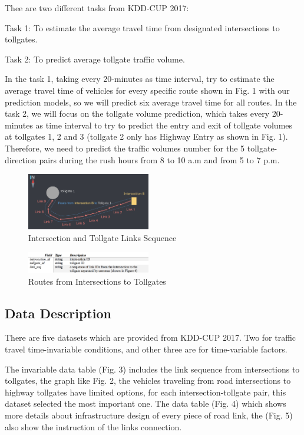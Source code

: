 \documentclass[journal, letterpaper]{IEEEtran}
\begin{document}
Thee are two different tasks from KDD-CUP 2017: 

	Task 1: To estimate the average travel time from designated intersections to tollgates. 
    
    Task 2: To predict average tollgate traffic volume.

In the task 1, taking every 20-minutes as time interval, try to estimate the average travel time of vehicles for every specific route shown in Fig. 1 with our prediction models, so we will predict six average travel time for all routes. In the task 2, we will focus on the tollgate volume prediction, which takes every 20-minutes as time interval to try to predict the entry and exit of tollgate volumes at tollgates 1, 2 and 3 (tollgate 2 only has Highway Entry as shown in Fig. 1). Therefore, we need to predict the traffic volumes number for the 5 tollgate-direction pairs during the rush hours from 8 to 10 a.m and from 5 to 7 p.m.

\begin{figure} [t]
  \centering
  \includegraphics[width=0.48\textwidth]{link-sequence.png}
  \caption{Intersection and Tollgate Links Sequence}
  \label{fig:2}
\end{figure}

\begin{figure} [H]
  \centering
  \includegraphics[width=0.48\textwidth]{route.png}
  \caption{Routes from Intersections to Tollgates}
  \label{fig:3}
\end{figure}

\subsection{Data Description}

There are five datasets which are provided from KDD-CUP 2017. Two for traffic travel time-invariable conditions, and other three are for time-variable factors. 

The invariable data table (Fig. 3) includes the link sequence from intersections to tollgates, the graph like Fig. 2, the vehicles traveling from road intersections to highway tollgates have limited options, for each intersection-tollgate pair, this dataset selected the most important one. The data table (Fig. 4) which shows more details about infrastructure design of every piece of road link, the (Fig. 5) also show the instruction of the links connection. 
\end{document}
